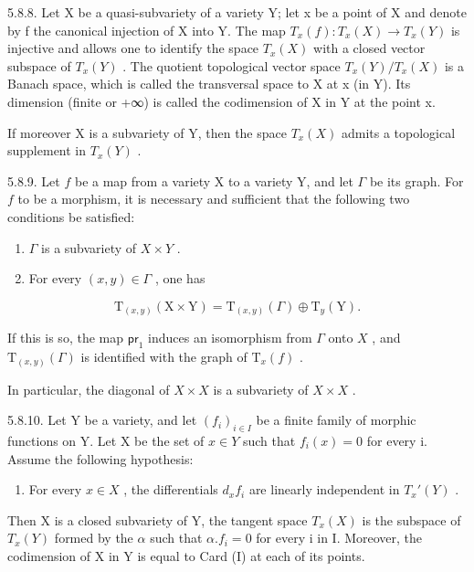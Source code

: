 5.8.8. Let X be a quasi-subvariety of a variety Y; let x be a point of X and denote by f the canonical injection of X into Y. The map \(T_{x}(f):T_{x}(X)\to T_{x}(Y)\) is injective and allows one to identify the space \(T_{x}(X)\) with a closed vector subspace of \(T_{x}(Y)\) . The quotient topological vector space \(T_{x}(Y)/T_{x}(X)\) is a Banach space, which is called the transversal space to X at x (in Y). Its dimension (finite or +∞) is called the codimension of X in Y at the point x.

If moreover X is a subvariety of Y, then the space \(T_{x}(X)\) admits a topological supplement in \(T_{x}(Y)\) .

5.8.9. Let \(f\) be a map from a variety X to a variety Y, and let \(\Gamma\) be its graph. For \(f\) to be a morphism, it is necessary and sufficient that the following two conditions be satisfied:

\begin{enumerate}
\def\labelenumi{(\roman{enumi})}
\item
  \(\Gamma\) is a subvariety of \(X \times Y\) .
\item
  For every \((x, y) \in \Gamma\) , one has
\end{enumerate}

\[
\mathrm{T} _ {(x, y)} (\mathrm{X} \times \mathrm{Y}) = \mathrm{T} _ {(x, y)} (\Gamma) \oplus \mathrm{T} _ {y} (\mathrm{Y}).
\]

If this is so, the map \(\mathsf{pr}_1\) induces an isomorphism from \(\Gamma\) onto \(X\) , and \(\mathrm{T}_{(x,y)}(\Gamma)\) is identified with the graph of \(\mathrm{T}_x(f)\) .

In particular, the diagonal of \(X \times X\) is a subvariety of \(X \times X\) .

5.8.10. Let Y be a variety, and let \((f_{i})_{i\in I}\) be a finite family of morphic functions on Y. Let X be the set of \(x\in Y\) such that \(f_{i}(x)=0\) for every i. Assume the following hypothesis:

\begin{enumerate}
\def\labelenumi{(\Alph{enumi})}
\setcounter{enumi}{9}
\tightlist
\item
  For every \(x \in X\) , the differentials \(d_x f_i\) are linearly independent in \(T_x'(Y)\) .
\end{enumerate}

Then X is a closed subvariety of Y, the tangent space \(T_{x}(X)\) is the subspace of \(T_{x}(Y)\) formed by the \(\alpha\) such that \(\alpha.f_{i}=0\) for every i in I. Moreover, the codimension of X in Y is equal to Card (I) at each of its points.

